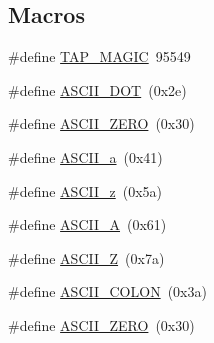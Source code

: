 \subsection*{Macros}
\begin{DoxyCompactItemize}
\item 
\#define \hyperlink{tap-device-creator_8cc_af9ac95d538205da6013d79a63fee2bd7}{T\+A\+P\+\_\+\+M\+A\+G\+IC}~95549
\item 
\#define \hyperlink{tap-device-creator_8cc_a6ec0f0cb1e0c4e317469e4103bec5fd5}{A\+S\+C\+I\+I\+\_\+\+D\+OT}~(0x2e)
\item 
\#define \hyperlink{tap-device-creator_8cc_abde11a6ee98560227d0d3889da0408e4}{A\+S\+C\+I\+I\+\_\+\+Z\+E\+RO}~(0x30)
\item 
\#define \hyperlink{tap-device-creator_8cc_acb0c7653dabe53da8a7fb03bcad505e7}{A\+S\+C\+I\+I\+\_\+a}~(0x41)
\item 
\#define \hyperlink{tap-device-creator_8cc_a76cb409bf2d31112b1bec0056271e3ce}{A\+S\+C\+I\+I\+\_\+z}~(0x5a)
\item 
\#define \hyperlink{tap-device-creator_8cc_a6ccdee41712ed103021e82cb944f47e6}{A\+S\+C\+I\+I\+\_\+A}~(0x61)
\item 
\#define \hyperlink{tap-device-creator_8cc_a282e9a9765b0ae5f0a4aa813c3a4932c}{A\+S\+C\+I\+I\+\_\+Z}~(0x7a)
\item 
\#define \hyperlink{tap-device-creator_8cc_aa13140b716dfb153353b2bf8be77d3f5}{A\+S\+C\+I\+I\+\_\+\+C\+O\+L\+ON}~(0x3a)
\item 
\#define \hyperlink{tap-device-creator_8cc_abde11a6ee98560227d0d3889da0408e4}{A\+S\+C\+I\+I\+\_\+\+Z\+E\+RO}~(0x30)
\end{DoxyCompactItemize}
